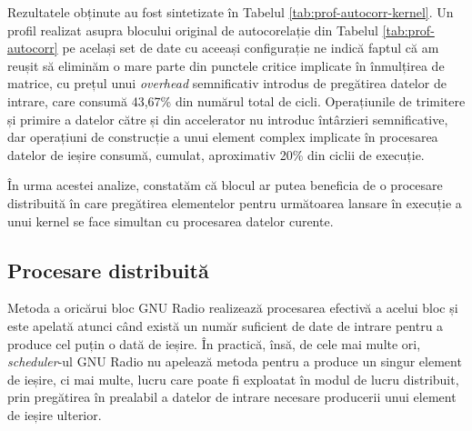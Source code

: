 

Rezultatele obținute au fost sintetizate în Tabelul
\ref{tab:prof-autocorr-kernel}.  Un profil realizat asupra blocului original de
autocorelație din Tabelul \ref{tab:prof-autocorr} pe același set de date cu
aceeași configurație ne indică faptul că am reușit să eliminăm o mare parte din
punctele critice implicate în înmulțirea de matrice, cu prețul unui
\textit{overhead} semnificativ introdus de pregătirea datelor de intrare, care
consumă 43,67\% din numărul total de cicli. Operațiunile de trimitere și primire
a datelor către și din accelerator nu introduc întârzieri semnificative, dar
operațiuni de construcție a unui element complex implicate în procesarea datelor
de ieșire consumă, cumulat, aproximativ 20\% din ciclii de execuție.

În urma acestei analize, constatăm că blocul ar putea beneficia de o procesare
distribuită în care pregătirea elementelor pentru următoarea lansare în execuție
a unui kernel se face simultan cu procesarea datelor curente. 




\subsection{Procesare distribuită}

Metoda  a oricărui bloc GNU Radio realizează procesarea efectivă a
acelui bloc și este apelată atunci când există un număr suficient de date de
intrare pentru a produce cel puțin o dată de ieșire. În practică, însă, de cele
mai multe ori,
\textit{scheduler}-ul GNU Radio nu apelează metoda  pentru a produce
un singur element de ieșire, ci mai multe, lucru care poate fi exploatat în
modul de lucru distribuit, prin pregătirea în prealabil a datelor de intrare
necesare producerii unui element de ieșire ulterior. \\


